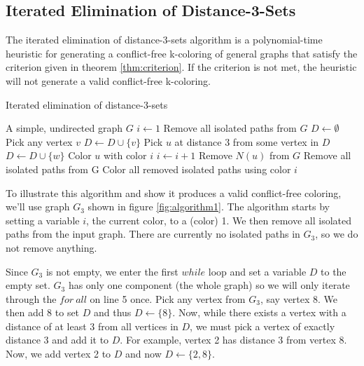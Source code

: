 \documentclass{sig-alternate}
\begin{document}
\subsection{Iterated Elimination of Distance-3-Sets}
\label{sec:iterated}
The iterated elimination of distance-3-sets algorithm is a polynomial-time heuristic for generating a conflict-free k-coloring of general graphs that satisfy the criterion given in theorem \ref{thm:criterion}. If the criterion is not met, the heuristic will not generate a valid conflict-free k-coloring.

\begin{algorithm}
\caption{Iterated elimination of distance-3-sets} \label{alg:elimination}
\begin{algorithmic}[1]
\Input A simple, undirected graph $G$
\State $i \gets 1$
\State Remove all isolated paths from $G$
	\State $D \gets \emptyset$
		\State Pick any vertex $v$
		\State $D \gets D \cup \{ v \}$
			\State Pick $u$ at distance 3 from some vertex in $D$
			\State $D \gets D \cup \{ w \}$
		\EndWhile
			\State Color $u$ with color $i$
		\EndFor
		\State $i \gets i + 1$
			\State Remove $N(u)$ from $G$
		\EndFor
		\State Remove all isolated paths from G
	\EndFor
\EndWhile
\State Color all removed isolated paths using color $i$
\end{algorithmic}
\end{algorithm}

To illustrate this algorithm and show it produces a valid conflict-free coloring, we'll use graph $G_3$ shown in figure \ref{fig:algorithm1}. The algorithm starts by setting a variable $i$, the current color, to a (color) 1. We then remove all isolated paths from the input graph. There are currently no isolated paths in $G_3$, so we do not remove anything.

Since $G_3$ is not empty, we enter the first $while$ loop and set a variable $D$ to the empty set. $G_3$ has only one component (the whole graph) so we will only iterate through the $for\ all$ on line 5 once. Pick any vertex from $G_3$, say vertex 8. We then add 8 to set $D$ and thus $D \gets \{8\}$. Now, while there exists a vertex with a distance of at least 3 from all vertices in $D$, we must pick a vertex of exactly distance 3 and add it to $D$. For example, vertex 2 has distance 3 from vertex 8. Now, we add vertex 2 to $D$ and now $D \gets \{2, 8\}$.
\end{document}
